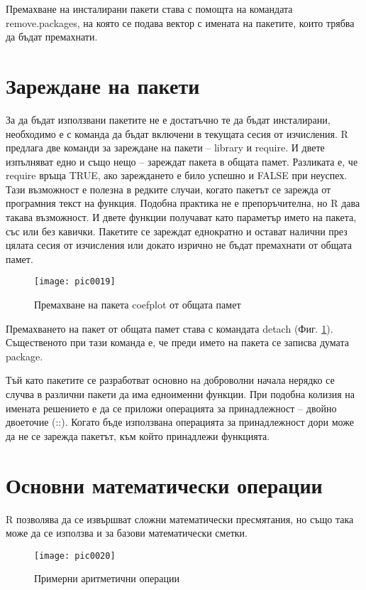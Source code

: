 Премахване на инсталирани пакети става с помощта на командата remove.packages, на която се подава вектор с имената на пакетите, които трябва да бъдат премахнати.

\section{Зареждане на пакети}

За да бъдат използвани пакетите не е достатъчно те да бъдат инсталирани, необходимо е с команда да бъдат включени в текущата сесия от изчисления. R предлага две команди за зареждане на пакети – library и require. И двете изпълняват едно и също нещо – зареждат пакета в общата памет. Разликата е, че require връща TRUE, ако зареждането е било успешно и FALSE при неуспех. Тази възможност е полезна в редките случаи, когато пакетът се зарежда от програмния текст на функция. Подобна практика не е препоръчителна, но R дава такава възможност. И двете функции получават като параметър името на пакета, със или без кавички. Пакетите се зареждат еднократно и остават налични през цялата сесия от изчисления или докато изрично не бъдат премахнати от общата памет.

\begin{figure}[h!]
  \centering
  \texttt{[image: pic0019]}
  \caption{Премахване на пакета coefplot от общата памет}
\label{figure0019}
\end{figure}
\FloatBarrier

Премахването на пакет от общата памет става с командата detach (Фиг. \ref{figure0019}). Същественото при тази команда е, че преди името на пакета се записва думата package. 

Тъй като пакетите се разработват основно на доброволни начала нерядко се случва в различни пакети да има едноименни функции. При подобна колизия на имената решението е да се приложи операцията за принадлежност – двойно двоеточие (::). Когато бъде използвана операцията за принадлежност дори може да не се зарежда пакетът, към който принадлежи функцията.

\section{Основни математически операции}

R позволява да се извършват сложни математически пресмятания, но също така може да се използва и за базови математически сметки. 

\begin{figure}[h!]
  \centering
  \texttt{[image: pic0020]}
  \caption{Примерни аритметични операции}
\label{figure0020}
\end{figure}
\FloatBarrier

